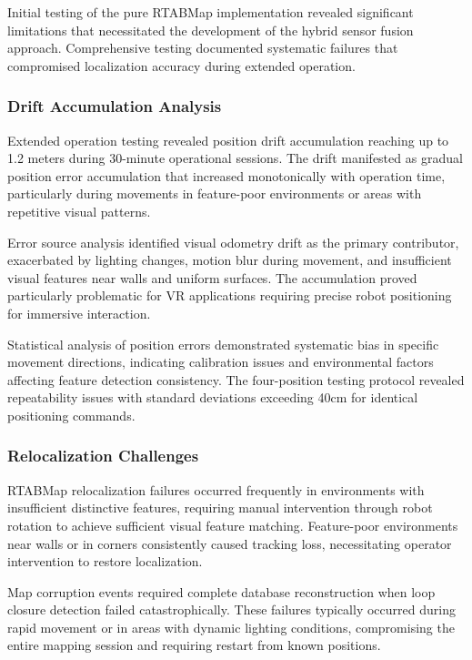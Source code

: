 Initial testing of the pure RTABMap implementation revealed significant limitations that necessitated the development of the hybrid sensor fusion approach. Comprehensive testing documented systematic failures that compromised localization accuracy during extended operation.

\subsubsection{Drift Accumulation Analysis}

Extended operation testing revealed position drift accumulation reaching up to 1.2 meters during 30-minute operational sessions. The drift manifested as gradual position error accumulation that increased monotonically with operation time, particularly during movements in feature-poor environments or areas with repetitive visual patterns.

Error source analysis identified visual odometry drift as the primary contributor, exacerbated by lighting changes, motion blur during movement, and insufficient visual features near walls and uniform surfaces. The accumulation proved particularly problematic for VR applications requiring precise robot positioning for immersive interaction.

Statistical analysis of position errors demonstrated systematic bias in specific movement directions, indicating calibration issues and environmental factors affecting feature detection consistency. The four-position testing protocol revealed repeatability issues with standard deviations exceeding 40cm for identical positioning commands.

\subsubsection{Relocalization Challenges}

RTABMap relocalization failures occurred frequently in environments with insufficient distinctive features, requiring manual intervention through robot rotation to achieve sufficient visual feature matching. Feature-poor environments near walls or in corners consistently caused tracking loss, necessitating operator intervention to restore localization.

Map corruption events required complete database reconstruction when loop closure detection failed catastrophically. These failures typically occurred during rapid movement or in areas with dynamic lighting conditions, compromising the entire mapping session and requiring restart from known positions.

